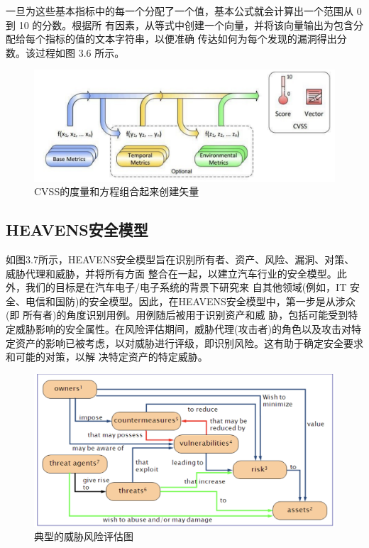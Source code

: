 一旦为这些基本指标中的每一个分配了一个值，基本公式就会计算出一个范围从 0 到 10 的分数。根据所
有因素，从等式中创建一个向量，并将该向量输出为包含分配给每个指标的值的文本字符串，以便准确
传达如何为每个发现的漏洞得出分数。该过程如图 3.6 所示。
\begin{figure}
    \centering
    \includegraphics[scale=0.6]{resources/img/i9.png}
    \caption{CVSS的度量和方程组合起来创建矢量}
  \end{figure}

  \subsection{HEAVENS安全模型}
  如图3.7所示，HEAVENS安全模型\cite{haringajoint}旨在识别所有者、资产、风险、漏洞、对策、威胁代理和威胁，并将所有方面
整合在一起，以建立汽车行业的安全模型。此外，我们的目标是在汽车电子/电子系统的背景下研究来
自其他领域(例如，IT 安全、电信和国防)的安全模型。因此，在HEAVENS安全模型中，第一步是从涉众(即
所有者)的角度识别用例。用例随后被用于识别资产和威
胁，包括可能受到特定威胁影响的安全属性。在风险评估期间，威胁代理(攻击者)的角色以及攻击对特
定资产的影响已被考虑，以对威胁进行评级，即识别风险。这有助于确定安全要求和可能的对策，以解
决特定资产的特定威胁。

\begin{figure}
    \centering
    \includegraphics[scale=0.6]{resources/img/i10.png}
    \caption{典型的威胁风险评估图}
  \end{figure}


